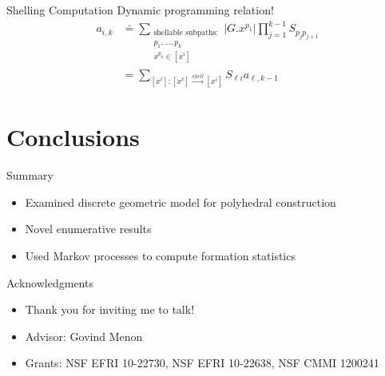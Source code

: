 \documentclass{beamer}
\begin{document}
\begin{frame}{Shelling Computation}
Dynamic programming relation! 
\begin{align}
a_{i,k} &\doteq \sum_{\substack{\text{shellable subpaths}:\\ p_1, \dots, p_k \\ x^{p_k} \in [x^i]}}|G.x^{p_1}|\prod_{j=1}^{k-1}S_{p_j p_{j+1}} \\  
&= \sum_{[x^\ell]:[x^\ell]\xrightarrow{shell}[x^i]} S_{\ell i} a_{\ell, k-1}
\end{align}

\end{frame}
\section{Conclusions}
\begin{frame}{Summary}
\begin{itemize}
  \item Examined discrete geometric model for polyhedral construction
  \item Novel enumerative results
  \item Used Markov processes to compute formation statistics
\end{itemize}
\end{frame}
\begin{frame}{Acknowledgments}
\begin{itemize}
\item Thank you for inviting me to talk! 
\item Advisor: Govind Menon
\item Grants: NSF EFRI 10-22730, NSF EFRI 10-22638, NSF CMMI 1200241
\end{itemize}
\end{frame}
\end{document}
